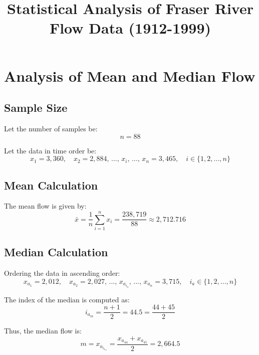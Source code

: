 \documentclass{article}
\begin{document}
\title{Statistical Analysis of Fraser River Flow Data (1912-1999)}
\author{}
\date{}
\maketitle

\section{Analysis of Mean and Median Flow}

\subsection{Sample Size}
Let the number of samples be:
\begin{equation}
    n=88
\end{equation}

Let the data in time order be:
\begin{equation}
    x_1 = 3,360,\quad x_2 = 2,884,\,...,\,x_i,\,...,\,x_n = 3,465,\quad i \in \{1,2,...,n\}
\end{equation}

\subsection{Mean Calculation}
The mean flow is given by:
\begin{equation}
    \bar{x} = \frac{1}{n}\sum_{i=1}^{n}x_i = \frac{238,719}{88} \approx 2,712.716
\end{equation}

\subsection{Median Calculation}
Ordering the data in ascending order:
\begin{equation}
    x_{a_1} = 2,012,\quad x_{a_2} = 2,027,\,...,\,x_{a_{i_a}},\,...,\,x_{a_n} = 3,715,\quad i_a \in \{1,2,...,n\}
\end{equation}

The index of the median is computed as:
\begin{equation}
    i_{a_m} = \frac{n+1}{2} = 44.5 = \frac{44+45}{2}
\end{equation}

Thus, the median flow is:
\begin{equation}
    m = x_{a_{i_{a_m}}} = \frac{x_{a_{44}}+x_{a_{45}}}{2} = 2,664.5
\end{equation}
\end{document}
